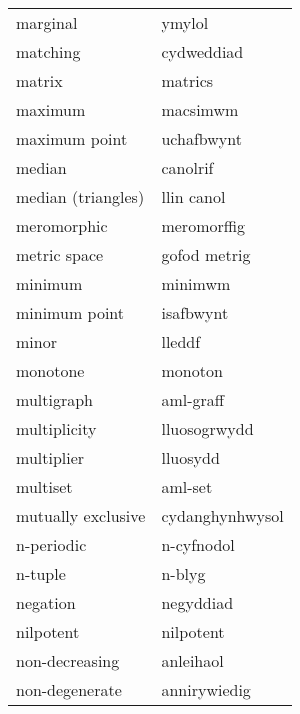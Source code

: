 \begin{supertabular}{p{0.22\textwidth}p{0.22\textwidth}}
                        marginal &                          ymylol \\
                        matching &                      cydweddiad \\
                          matrix &                         matrics \\
                         maximum &                        macsimwm \\
                   maximum point &                      uchafbwynt \\
                          median &                        canolrif \\
              median (triangles) &                      llin canol \\
                     meromorphic &                     meromorffig \\
                    metric space &                    gofod metrig \\
                         minimum &                         minimwm \\
                   minimum point &                       isafbwynt \\
                           minor &                          lleddf \\
                        monotone &                         monoton \\
                      multigraph &                       aml-graff \\
                    multiplicity &                    lluosogrwydd \\
                      multiplier &                        lluosydd \\
                        multiset &                         aml-set \\
              mutually exclusive &                 cydanghynhwysol \\
                      n-periodic &                      n-cyfnodol \\
                         n-tuple &                          n-blyg \\
                        negation &                       negyddiad \\
                       nilpotent &                       nilpotent \\
                  non-decreasing &                       anleihaol \\
                  non-degenerate &                    annirywiedig \\

\end{supertabular}
